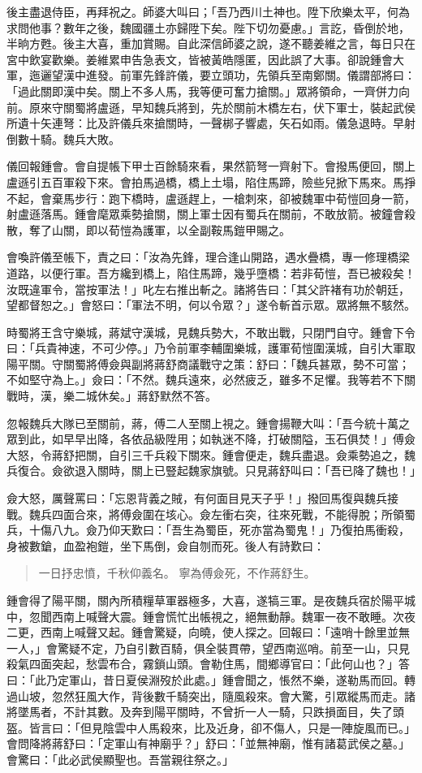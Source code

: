 後主盡退侍臣，再拜祝之。師婆大叫曰；「吾乃西川土神也。陞下欣樂太平，何為求問他事？數年之後，魏國疆土亦歸陞下矣。陛下切勿憂慮。」言訖，昏倒於地，半晌方甦。後主大喜，重加賞賜。自此深信師婆之說，遂不聽姜維之言，每日只在宮中飲宴歡樂。姜維累申告急表文，皆被黃皓隱匿，因此誤了大事。卻說鍾會大軍，迤邐望漢中進發。前軍先鋒許儀，要立頭功，先領兵至南鄭關。儀謂部將曰：「過此關即漢中矣。關上不多人馬，我等便可奮力搶關。」眾將領命，一齊併力向前。原來守關蜀將盧遜，早知魏兵將到，先於關前木橋左右，伏下軍士，裝起武侯所遺十矢連弩：比及許儀兵來搶關時，一聲梆子響處，矢石如雨。儀急退時。早射倒數十騎。魏兵大敗。

儀回報鍾會。會自提帳下甲士百餘騎來看，果然箭弩一齊射下。會撥馬便回，關上盧遜引五百軍殺下來。會拍馬過橋，橋上土塌，陷住馬蹄，險些兒掀下馬來。馬掙不起，會棄馬步行：跑下橋時，盧遜趕上，一槍刺來，卻被魏軍中荀愷回身一箭，射盧遜落馬。鍾會麾眾乘勢搶關，關上軍士因有蜀兵在關前，不敢放箭。被鐘會殺散，奪了山關，即以荀愷為護軍，以全副鞍馬鎧甲賜之。

會喚許儀至帳下，責之曰：「汝為先鋒，理合逢山開路，遇水疊橋，專一修理橋梁道路，以便行軍。吾方纔到橋上，陷住馬蹄，幾乎墮橋：若非荀愷，吾已被殺矣！汝既違軍令，當按軍法！」叱左右推出斬之。諸將告曰：「其父許褚有功於朝廷，望都督恕之。」會怒曰：「軍法不明，何以令眾？」遂令斬首示眾。眾將無不駭然。

時蜀將王含守樂城，蔣斌守漢城，見魏兵勢大，不敢出戰，只閉門自守。鍾會下令曰：「兵貴神速，不可少停。」乃令前軍李輔圍樂城，護軍荀愷圍漢城，自引大軍取陽平關。守關蜀將傅僉與副將蔣舒商議戰守之策：舒曰：「魏兵甚眾，勢不可當；不如堅守為上。」僉曰：「不然。魏兵遠來，必然疲乏，雖多不足懼。我等若不下關戰時，漢，樂二城休矣。」蔣舒默然不答。

忽報魏兵大隊已至關前，蔣，傅二人至關上視之。鍾會揚鞭大叫：「吾今統十萬之眾到此，如早早出降，各依品級陞用；如執迷不降，打破關隘，玉石俱焚！」傅僉大怒，令蔣舒把關，自引三千兵殺下關來。鍾會便走，魏兵盡退。僉乘勢追之，魏兵復合。僉欲退入關時，關上已豎起魏家旗號。只見蔣舒叫曰：「吾已降了魏也！」

僉大怒，厲聲罵曰：「忘恩背義之賊，有何面目見天子乎！」撥回馬復與魏兵接戰。魏兵四面合來，將傅僉圍在垓心。僉左衝右突，往來死戰，不能得脫；所領蜀兵，十傷八九。僉乃仰天歎曰：「吾生為蜀臣，死亦當為蜀鬼！」乃復拍馬衝殺，身被數鎗，血盈袍鎧，坐下馬倒，僉自刎而死。後人有詩歎曰：

\begin{quote}
一日抒忠憤，千秋仰義名。
寧為傅僉死，不作蔣舒生。
\end{quote}

鍾會得了陽平關，關內所積糧草軍器極多，大喜，遂犒三軍。是夜魏兵宿於陽平城中，忽聞西南上喊聲大震。鍾會慌忙出帳視之，絕無動靜。魏軍一夜不敢睡。次夜二更，西南上喊聲又起。鍾會驚疑，向曉，使人探之。回報曰：「遠哨十餘里並無一人，」會驚疑不定，乃自引數百騎，俱全裝貫帶，望西南巡哨。前至一山，只見殺氣四面突起，愁雲布合，霧鎖山頭。會勒住馬，間鄉導官曰：「此何山也？」答曰：「此乃定軍山，昔日夏侯淵歿於此處。」鍾會聞之，悵然不樂，遂勒馬而回。轉過山坡，忽然狂風大作，背後數千騎突出，隨風殺來。會大驚，引眾縱馬而走。諸將墜馬者，不計其數。及奔到陽平關時，不曾折一人一騎，只跌損面目，失了頭盔。皆言曰：「但見陰雲中人馬殺來，比及近身，卻不傷人，只是一陣旋風而已。」會問降將蔣舒曰：「定軍山有神廟乎？」舒曰：「並無神廟，惟有諸葛武侯之墓。」會驚曰：「此必武侯顯聖也。吾當親往祭之。」

